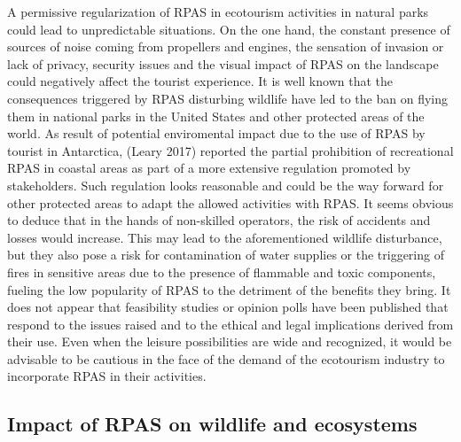 \documentclass[]{interact}
\theoremstyle{plain}%
\theoremstyle{definition}
\theoremstyle{remark}
\begin{document}
A permissive regularization of RPAS in ecotourism activities in natural
parks could lead to unpredictable situations. On the one hand, the
constant presence of sources of noise coming from propellers and
engines, the sensation of invasion or lack of privacy, security issues
and the visual impact of RPAS on the landscape could negatively affect
the tourist experience. It is well known that the consequences triggered
by RPAS disturbing wildlife have led to the ban on flying them in
national parks in the United States and other protected areas of the
world. As result of potential enviromental impact due to the use of RPAS
by tourist in Antarctica, (Leary 2017) reported the partial prohibition
of recreational RPAS in coastal areas as part of a more extensive
regulation promoted by stakeholders. Such regulation looks reasonable
and could be the way forward for other protected areas to adapt the
allowed activities with RPAS. It seems obvious to deduce that in the
hands of non-skilled operators, the risk of accidents and losses would
increase. This may lead to the aforementioned wildlife disturbance, but
they also pose a risk for contamination of water supplies or the
triggering of fires in sensitive areas due to the presence of flammable
and toxic components, fueling the low popularity of RPAS to the
detriment of the benefits they bring. It does not appear that
feasibility studies or opinion polls have been published that respond to
the issues raised and to the ethical and legal implications derived from
their use. Even when the leisure possibilities are wide and recognized,
it would be advisable to be cautious in the face of the demand of the
ecotourism industry to incorporate RPAS in their activities.

\subsection{Impact of RPAS on wildlife and
ecosystems}\label{impact-of-rpas-on-wildlife-and-ecosystems-1}
\end{document}
